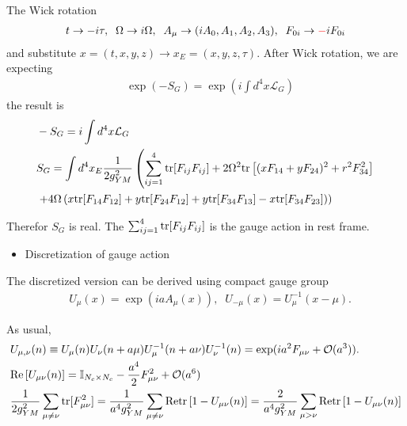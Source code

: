 The Wick rotation
\begin{equation}
\begin{split}
&t\to -i\tau,\;\;\Omega \to i\Omega ,\;\;A_{\mu}\to (iA_0,A_1,A_2,A_3),\;\;F_{0i}\to \textcolor[rgb]{1,0,0}{-}iF_{0i}\\
\end{split}
\end{equation}
and substitute $x=(t,x,y,z)\to x_E=(x,y,z,\tau)$. After Wick rotation, we are expecting
\begin{equation}
\begin{split}
&\exp(-S_G)=\exp (i\int d^4 x \mathcal{L}_G)
\end{split}
\end{equation}
the result is
\begin{equation}
\begin{split}
&-S_G=i\int d^4 x\mathcal{L}_G\\
&S_G=\int d^4 x_E \frac{1}{2g_{YM}^2}\left(\sum _{ij=1}^4 {\rm tr}[F_{ij}F_{ij}]+2\Omega^2 {\rm tr}\left[(x F_{14}+y F_{24})^2+r^2 F_{34}^2\right]\right.\\
&\left.+4\Omega\left(x {\rm tr}[F_{14}F_{12}]+y {\rm tr}[F_{24}F_{12}]+y {\rm tr}[F_{34}F_{13}]-x {\rm tr}[F_{34}F_{23}]\right)\right)
\end{split}
\end{equation}

Therefor $S_G$ is real. The $\sum _{ij=1}^4 {\rm tr}[F_{ij}F_{ij}]$ is the gauge action in rest frame.

\begin{itemize}
  \item Discretization of gauge action
\end{itemize}

The discretized version can be derived using compact gauge group
\begin{equation}
\begin{split}
&U_{\mu}(x)=\exp (i a A_{\mu}(x)),\;\;U_{-\mu}(x)=U_{\mu}^{-1}(x-\mu).
\end{split}
\end{equation}

As usual,
\begin{equation}
\begin{split}
&U_{\mu, \nu}(n)\equiv U_{\mu}(n)U_{\nu}(n+a\mu)U^{-1}_{\mu}(n+a\nu)U^{-1}_{\nu}(n)=\exp (ia^2 F_{\mu\nu}+\mathcal{O}(a^3)).\\
&{\rm Re}\left[U_{\mu \nu}(n)\right]=\mathbb{I}_{N_c\times N_c}-\frac{a^4}{2}F_{\mu\nu}^2+\mathcal{O}(a^6)\\
&\frac{1}{2g_{YM}^2}\sum _{\mu\neq \nu}{\rm tr}[F_{\mu\nu}^2]=\frac{1}{a^4g_{YM}^2}\sum _{\mu\neq \nu}{\rm Retr}\left[1-U_{\mu \nu}(n)\right]=\frac{2}{a^4g_{YM}^2}\sum _{\mu> \nu}{\rm Retr}\left[1-U_{\mu \nu}(n)\right]
\end{split}
\end{equation}

